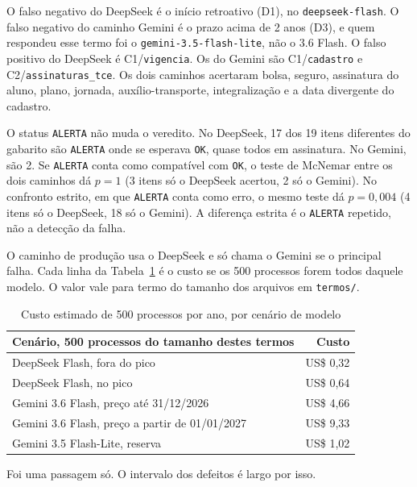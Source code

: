 O falso negativo do DeepSeek é o início retroativo (D1), no \texttt{deepseek-flash}. O falso negativo do caminho Gemini é o prazo acima de 2 anos (D3), e quem respondeu esse termo foi o \texttt{gemini-3.5-flash-lite}, não o 3.6 Flash. O falso positivo do DeepSeek é C1/\texttt{vigencia}. Os do Gemini são C1/\texttt{cadastro} e C2/\texttt{assinaturas\_tce}. Os dois caminhos acertaram bolsa, seguro, assinatura do aluno, plano, jornada, auxílio-transporte, integralização e a data divergente do cadastro.

O status \texttt{ALERTA} não muda o veredito. No DeepSeek, 17 dos 19 itens diferentes do gabarito são \texttt{ALERTA} onde se esperava \texttt{OK}, quase todos em assinatura. No Gemini, são 2. Se \texttt{ALERTA} conta como compatível com \texttt{OK}, o teste de McNemar entre os dois caminhos dá $p = 1$ (3 itens só o DeepSeek acertou, 2 só o Gemini). No confronto estrito, em que \texttt{ALERTA} conta como erro, o mesmo teste dá $p = 0{,}004$ (4 itens só o DeepSeek, 18 só o Gemini). A diferença estrita é o \texttt{ALERTA} repetido, não a detecção da falha.

O caminho de produção usa o DeepSeek e só chama o Gemini se o principal falha. Cada linha da Tabela~\ref{tab:custo-revisao-tce} é o custo se os 500 processos forem todos daquele modelo. O valor vale para termo do tamanho dos arquivos em \texttt{termos/}.

\begin{table}[H]
\centering
\caption{Custo estimado de 500 processos por ano, por cenário de modelo}
\label{tab:custo-revisao-tce}
\begin{tabular}{|p{10.5cm}|r|}
\hline
\textbf{Cenário, 500 processos do tamanho destes termos} & \textbf{Custo} \\
\hline
DeepSeek Flash, fora do pico & US\$ 0,32 \\
\hline
DeepSeek Flash, no pico & US\$ 0,64 \\
\hline
Gemini 3.6 Flash, preço até 31/12/2026 & US\$ 4,66 \\
\hline
Gemini 3.6 Flash, preço a partir de 01/01/2027 & US\$ 9,33 \\
\hline
Gemini 3.5 Flash-Lite, reserva & US\$ 1,02 \\
\hline
\end{tabular}
\end{table}

Foi uma passagem só. O intervalo dos defeitos é largo por isso.

